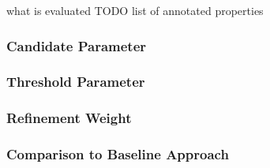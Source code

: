 what is evaluated TODO
list of annotated properties

\subsubsection{Candidate Parameter}
\subsubsection{Threshold Parameter}
\subsubsection{Refinement Weight}
\subsubsection{Comparison to Baseline Approach}